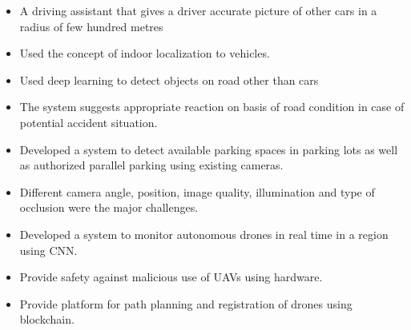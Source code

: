 \begin{itemize}
\item A driving assistant that gives a driver accurate picture of other cars in a radius of few hundred metres
\item Used the concept of indoor localization to \newline vehicles.
\item Used deep learning to detect objects on road other than cars
\item The system suggests appropriate reaction on basis of road condition in case of potential \newline accident situation.
\end{itemize}


\smallskip
\smallskip


\begin{itemize}
\item Developed a system to detect available parking spaces in parking lots as well as authorized parallel parking using existing cameras.
\item Different camera angle, position, image quality, illumination and type of occlusion were the major challenges.
\end{itemize}

\smallskip
\smallskip

\begin{itemize}
\item Developed a system to monitor autonomous drones in real time in a region using CNN.
\item Provide safety against malicious use of UAVs using hardware.
\item Provide platform for path planning and registration of drones using blockchain. 
\end{itemize}

\cvproject{}